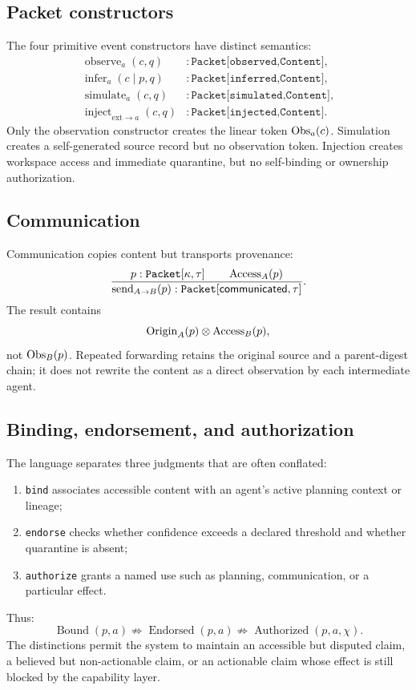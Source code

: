 \subsection{Packet constructors}

The four primitive event constructors have distinct semantics:
\begin{align*}
\operatorname{observe}_a(c,q)
&:\texttt{Packet[observed,Content]},\\
\operatorname{infer}_a(c\mid p,q)
&:\texttt{Packet[inferred,Content]},\\
\operatorname{simulate}_a(c,q)
&:\texttt{Packet[simulated,Content]},\\
\operatorname{inject}_{\mathrm{ext}\to a}(c,q)
&:\texttt{Packet[injected,Content]}.
\end{align*}
Only the observation constructor creates the linear token
\(\operatorname{Obs}_a(c)\).  Simulation creates a self-generated source record but no
observation token.  Injection creates workspace access and immediate
quarantine, but no self-binding or ownership authorization.

\subsection{Communication}

Communication copies content but transports provenance:
\[
\frac{
  p:\texttt{Packet}[\kappa,\tau]
  \qquad
  \operatorname{Access}_A(p)
}{
  \operatorname{send}_{A\to B}(p):
  \texttt{Packet}[\mathsf{communicated},\tau]
}.
\]
The result contains
\[
\operatorname{Origin}_A(p)\otimes\operatorname{Access}_B(p),
\]
not \(\operatorname{Obs}_B(p)\).  Repeated forwarding retains the original source and a
parent-digest chain; it does not rewrite the content as a direct observation by
each intermediate agent.

\subsection{Binding, endorsement, and authorization}

The language separates three judgments that are often conflated:
\begin{enumerate}[leftmargin=1.7em]
  \item \texttt{bind} associates accessible content with an agent's active
  planning context or lineage;
  \item \texttt{endorse} checks whether confidence exceeds a declared threshold
  and whether quarantine is absent;
  \item \texttt{authorize} grants a named use such as planning, communication,
  or a particular effect.
\end{enumerate}
Thus:
\[
\operatorname{Bound}(p,a)
\not\Rightarrow
\operatorname{Endorsed}(p,a)
\not\Rightarrow
\operatorname{Authorized}(p,a,\chi).
\]
The distinctions permit the system to maintain an accessible but disputed
claim, a believed but non-actionable claim, or an actionable claim whose effect
is still blocked by the capability layer.

